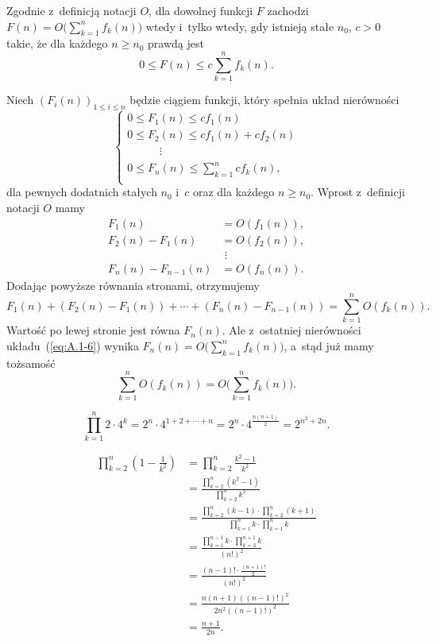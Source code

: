 \exercise{} %
\noindent Zgodnie z~definicją notacji $O$, dla dowolnej funkcji $F$ zachodzi $F(n) = O\bigl(\sum_{k=1}^nf_k(n)\bigr)$ wtedy i~tylko wtedy, gdy istnieją stałe $n_0$, $c>0$ takie, że dla każdego $n\ge n_0$ prawdą jest
\[
	0\le F(n)\le c\sum_{k=1}^n f_k(n).
\]

Niech $(F_i(n))_{1\le i\le n}$ będzie ciągiem funkcji, który spełnia układ nierówności
\begin{equation}
	\begin{cases}
		0 \le F_1(n) \le cf_1(n) \\
		0 \le F_2(n) \le cf_1(n)+cf_2(n) \\
		\phantom{0 \le F_2} \vdots \\
		0 \le F_n(n) \le \sum_{k=1}^ncf_k(n), \\
	\end{cases} \label{eq:A.1-6}
\end{equation}
dla pewnych dodatnich stałych $n_0$ i~$c$ oraz dla każdego $n\ge n_0$. Wprost z~definicji notacji $O$ mamy
\begin{align*}
	F_1(n) &= O(f_1(n)),\\
	F_2(n)-F_1(n) &= O(f_2(n)),\\
	& \,\,\vdots \\
	F_n(n)-F_{n-1}(n) &= O(f_n(n)).
\end{align*}
Dodając powyższe równania stronami, otrzymujemy
\[
	F_1(n)+(F_2(n)-F_1(n))+\cdots+(F_n(n)-F_{n-1}(n)) = \sum_{k=1}^nO(f_k(n)).
\]
Wartość po lewej stronie jest równa $F_n(n)$. Ale z~ostatniej nierówności układu~(\ref{eq:A.1-6}) wynika $F_n(n)=O\bigl(\sum_{k=1}^nf_k(n)\bigr)$, a~stąd już mamy tożsamość
\[
	\sum_{k=1}^nO(f_k(n)) = O\biggl(\sum_{k=1}^nf_k(n)\biggr).
\]

\exercise{} %
\[
	\prod_{k=1}^n2\cdot 4^k = 2^n\cdot 4^{1+2+\cdots+n} = 2^n\cdot 4^{\frac{n(n+1)}{2}} = 2^{n^2\!+2n}.
\]

\exercise{} %
\begin{align*}
	\prod_{k=2}^n\left(1-\frac{1}{k^2}\right) &= \prod_{k=2}^n\frac{k^2-1}{k^2} \\[2mm]
	&= \frac{\prod_{k=2}^n(k^2-1)}{\prod_{k=2}^nk^2} \\[2mm]
	&= \frac{\prod_{k=2}^n(k-1)\cdot\prod_{k=2}^n(k+1)}{\prod_{k=1}^nk\cdot\prod_{k=1}^nk} \\[2mm]
	&= \frac{\prod_{k=1}^{n-1}k\cdot\prod_{k=3}^{n+1}k}{(n!)^2} \\[2mm]
	&= \frac{(n-1)!\cdot\frac{(n+1)!}{2}}{(n!)^2} \\[2mm]
	&= \frac{n(n+1)((n-1)!)^2}{2n^2((n-1)!)^2} \\[2mm]
	&= \frac{n+1}{2n}.
\end{align*}

